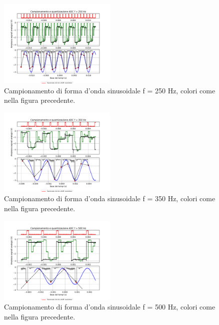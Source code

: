 \documentclass[journal]{IEEEtran}
\begin{document}
\vspace{-10mm}
%
\begin{figure}[H]%
\begin{center}
\includegraphics[trim={0 25 0 0}, clip,width=0.50\textwidth]{analysis/output/campionamento_250Hz.pdf}
\caption{Campionamento di forma d'onda sinusoidale f = 250 Hz, colori come nella figura precedente.}
\label{fig:sampSH3}
\end{center}
\end{figure}
\vspace{-10mm}
%
\begin{figure}[H]%
\begin{center}
\includegraphics[trim={0 40 0 0}, clip,width=0.50\textwidth]{analysis/output/campionamento_350Hz.pdf}
\caption{Campionamento di forma d'onda sinusoidale f = 350 Hz, colori come nella figura precedente.}
\label{fig:sampSH4}
\end{center}
\end{figure}
\vspace{-10mm}
%
\begin{figure}[H]%
\begin{center}
\includegraphics[trim={0 40 0 0}, clip,width=0.50\textwidth]{analysis/output/campionamento_500Hz.pdf}
\caption{Campionamento di forma d'onda sinusoidale f = 500 Hz, colori come nella figura precedente.}
\label{fig:sampSH5}
\end{center}
\end{figure}
\end{document}
